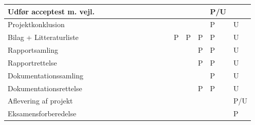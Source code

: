 \documentclass[landscape, 12pt, letterpaper]{article}
\begin{document}
\begin{table}[]
\begin{tabular}{|l|l|l|l|l|l|l|l|l|l|l|l|l|l|l|l|}
Udfør acceptest m. vejl.&    &    &    &    &    &    &    &    &    &    &    &    &    & P/U&    \\ \hline
Projektkonklusion       &    &    &    &    &    &    &    &    &    &    &    &    &    & P  &  U \\ \hline
Bilag + Litteraturliste &    &    &    &    &    &    &    &    &    &    &  P & P  &  P &  P &  U \\ \hline
Rapportsamling          &    &    &    &    &    &    &    &    &    &    &    &    &  P &  P &  U \\ \hline
Rapportrettelse         &    &    &    &    &    &    &    &    &    &    &    &    & P  &  P &  U \\ \hline
Dokumentationssamling   &    &    &    &    &    &    &    &    &    &    &    &    &    &  P &  U \\ \hline
Dokumentationsrettelse  &    &    &    &    &    &    &    &    &    &    &    &    &  P &  P &  U \\ \hline
Aflevering af projekt   &    &    &    &    &    &    &    &    &    &    &    &    &    &    & P/U \\ \hline
Eksamensforberedelse    &    &    &    &    &    &    &    &    &    &    &    &    &    &    &  P \\ \hline

\end{tabular}
\end{table}
\end{document}

